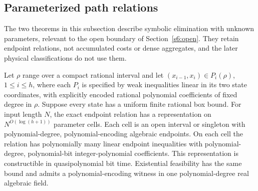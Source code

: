 \subsection{Parameterized path relations}\label{s5:parameter-paths}

The two theorems in this subsection describe symbolic elimination with
unknown parameters, relevant to the open boundary of
Section~\ref{s6:open}. They retain endpoint relations, not accumulated
costs or dense aggregates, and the later physical classifications do
not use them.

\begin{theorem}
\label{s5:quasipoly-path}
Let $\rho$ range over a compact rational interval and let
$(x_{i-1},x_i)\in P_i(\rho)$, $1\le i\le h$, where each $P_i$ is
specified by weak inequalities linear in its two state coordinates,
with explicitly encoded rational polynomial coefficients of fixed
degree in $\rho$. Suppose every state has a uniform finite rational
box bound. For input length $N$, the exact endpoint relation has a
representation on $N^{O(\log(h+1))}$ parameter cells. Each cell is an
open interval or singleton with polynomial-degree, polynomial-encoding
algebraic endpoints. On each cell the relation has polynomially many
linear endpoint inequalities with polynomial-degree, polynomial-bit
integer-polynomial coefficients. This representation is constructible
in quasipolynomial bit time. Existential feasibility has the same bound
and admits a polynomial-encoding witness in one polynomial-degree real
algebraic field.
\end{theorem}
